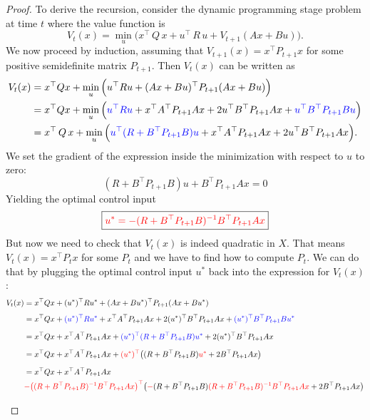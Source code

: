 \begin{proof}
To derive the recursion, consider the dynamic programming stage problem at time $t$ where the value function is 
$$ 
V_t(x) = \min_{u} \Big( x^\top\, Q \,x + u^\top\, R \,u + V_{t+1}(A x + B u) \Big).
$$
We now proceed by induction, assuming that $V_{t+1}(x) = x^\top P_{t+1} x$ for some positive semidefinite matrix $P_{t+1}$. Then $V_t(x)$ can be written as
\begin{align*}
V_t(x) &= x^\top Q x + \min_{u} \Big(u^\top R u + (A x + B u)^\top P_{t+1} (A x + B u) \Big) \\
&= x^\top Q x + \min_{u} \Big(
\textcolor{blue}{u^\top R u}
+ x^\top A^\top P_{t+1} A x
+ 2 u^\top B^\top P_{t+1} A x
+ \textcolor{blue}{u^\top B^\top P_{t+1} B u}
\Big) \\
&= x^\top \, Q \, x  + \min_{u} \Big(
\textcolor{blue}{u^\top (R + B^\top P_{t+1} B) u} 
+ x^\top A^\top P_{t+1} A x
+ 2 u^\top B^\top P_{t+1} A x
\Big).
\end{align*}
We set the gradient of the expression inside the minimization with respect to $u$ to zero:
$$ (R+B^\top P_{t+1} B) u + B^\top P_{t+1} A x = 0 $$
Yielding the optimal control input
$$\boxed{\textcolor{red}{u^* = - (R + B^\top P_{t+1} B)^{-1} B^\top P_{t+1} A x}}$$
But now we need to check that $V_t(x)$ is indeed quadratic in $X$. That means $V_t(x) = x^\top P_t x$ for some $P_t$ and we have to find how to compute $P_t$. We can do that by plugging the optimal control input $u^*$ back into the expression for $V_t(x)$:
\begin{align*}
V_t(x)
&= x^\top Q x + (u^*)^\top R u^* + (A x + B u^*)^\top P_{t+1} (A x + B u^*) \\[4pt]
&= x^\top Q x
+ \textcolor{blue}{(u^*)^\top R u^*}
+ x^\top A^\top P_{t+1} A x
+ 2 (u^*)^\top B^\top P_{t+1} A x
+ \textcolor{blue}{(u^*)^\top B^\top P_{t+1} B u^*} \\[6pt]
&= x^\top Q x
+ x^\top A^\top P_{t+1} A x
+ \textcolor{blue}{(u^*)^\top (R + B^\top P_{t+1} B) u^*}
+ 2 (u^*)^\top B^\top P_{t+1} A x \\[6pt]
&= x^\top Q x
+ x^\top A^\top P_{t+1} A x
+ \textcolor{red}{(u^*)^\top} \bigr( (R+B^\top P_{t+1} B)\textcolor{red}{u^*} + 2 B^\top P_{t+1} A x \bigl) \\[6pt]
&=x^\top Q x
+ x^\top A^\top P_{t+1} A x\\
&\textcolor{red}{- \bigl((R+B^\top P_{t+1} B)^{-1} B^\top P_{t+1} A x\bigr)^\top} \bigr( \textcolor{red}{-}(R+B^\top P_{t+1} B)\textcolor{red}{(R+B^\top P_{t+1} B)^{-1} B^\top P_{t+1} A x} + 2 B^\top P_{t+1} A x \bigl) \\[6pt]

\end{align*}
\end{proof}
